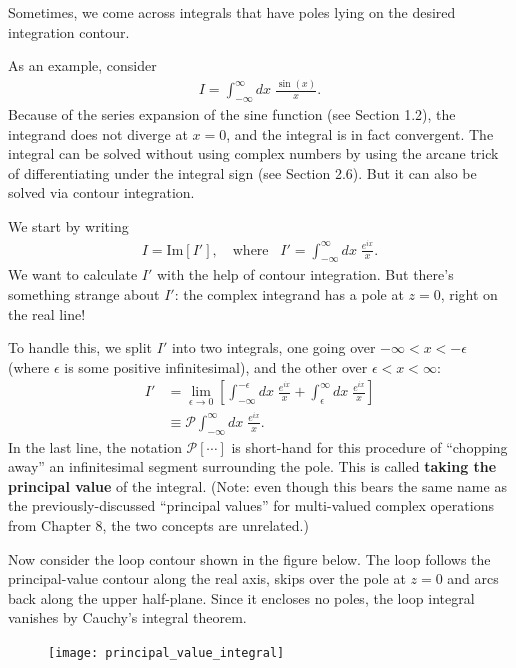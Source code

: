 \documentclass[10pt,a4paper]{article}
\begin{document}
Sometimes, we come across integrals that have poles lying on the
desired integration contour.

As an example, consider
\begin{align}
  I = \int_{-\infty}^\infty dx\; \frac{\sin(x)}{x}.
\end{align}
Because of the series expansion of the sine function (see Section
1.2), the integrand does not diverge at $x = 0$, and the integral is
in fact convergent. The integral can be solved without using complex
numbers by using the arcane trick of differentiating under the
integral sign (see Section 2.6).  But it can also be solved via
contour integration.

We start by writing
\begin{align}
  I = \mathrm{Im}[I'], \quad \mathrm{where}\;\;\; I' = \int_{-\infty}^\infty dx\; \frac{e^{ix}}{x}.
\end{align}
We want to calculate $I'$ with the help of contour integration.  But
there's something strange about $I'$: the complex integrand has a pole
at $z = 0$, right on the real line!

To handle this, we split $I'$ into two integrals, one going over
$-\infty < x < -\epsilon$ (where $\epsilon$ is some positive
infinitesimal), and the other over $\epsilon < x < \infty$:
\begin{align}
  I' &= \lim_{\epsilon \rightarrow 0} \left[ \int_{-\infty}^{-\epsilon} dx\; \frac{e^{ix}}{x} + \int_{\epsilon}^\infty dx\; \frac{e^{ix}}{x}\right] \\
  &\equiv \mathcal{P} \int_{-\infty}^\infty dx\; \frac{e^{ix}}{x}.
\end{align}
In the last line, the notation $\mathcal{P}[\cdots]$ is short-hand for
this procedure of ``chopping away'' an infinitesimal segment
surrounding the pole.  This is called \textbf{taking the principal
  value} of the integral.  (Note: even though this bears the same name
as the previously-discussed ``principal values'' for multi-valued
complex operations from Chapter 8, the two concepts are unrelated.)

Now consider the loop contour shown in the figure below.  The loop
follows the principal-value contour along the real axis, skips over
the pole at $z = 0$ and arcs back along the upper half-plane.  Since
it encloses no poles, the loop integral vanishes by Cauchy's integral
theorem.

\begin{figure}[ht]
  \centering\texttt{[image: principal\_value\_integral]}
\end{figure}
\end{document}

